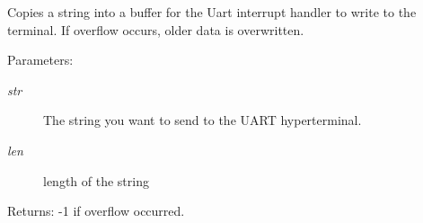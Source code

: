Copies a string into a buffer for the Uart interrupt handler to write to the terminal. If overflow occurs, older data is overwritten.

\begin{Desc}
\item[Parameters:]
\begin{description}
\item[{\em str}]The string you want to send to the UART hyperterminal. \item[{\em len}]length of the string\end{description}
\end{Desc}
\begin{Desc}
\item[Returns:]-1 if overflow occurred. \end{Desc}
